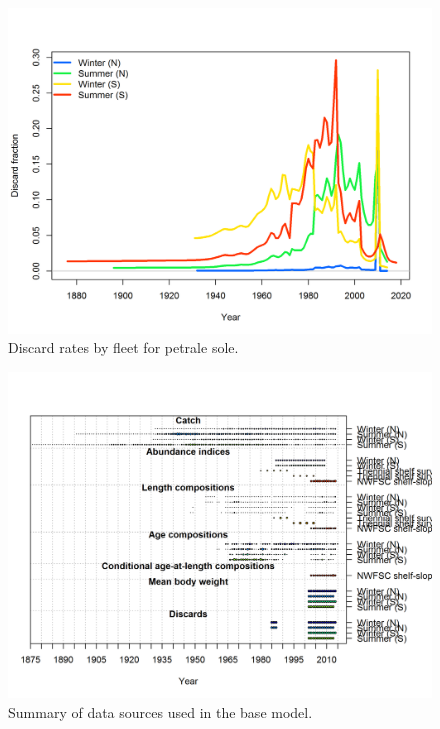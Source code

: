 \documentclass[12pt,]{article}
\begin{document}
\begin{figure}
\centering
\includegraphics{r4ss/plots_mod1/catch8 discard fraction.png}
\caption{Discard rates by fleet for petrale sole. \label{fig:Discard}}
\end{figure}

\FloatBarrier

\begin{figure}
\centering
\includegraphics{r4ss/plots_mod1/data_plot2.png}
\caption{Summary of data sources used in the base model.
\label{fig:data_plot}}
\end{figure}

\FloatBarrier
\end{document}
